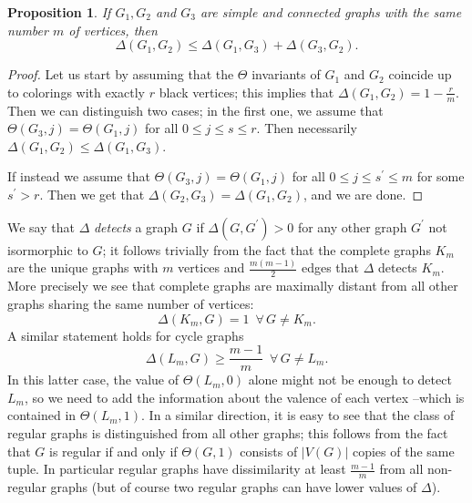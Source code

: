 \documentclass[11pt, a4paper, reqno, twoside, makeidx]{amsart}
\theoremstyle{remark}
\theoremstyle{plain}
\newtheorem{prop}[thm]{Proposition}
\theoremstyle{definition}
\begin{document}
\begin{prop}\label{prop:triangleineq}
If $G_1,G_2$ and $G_3$ are simple and connected graphs with the same number $m$ of vertices, then 
$$\Delta(G_1,G_2) \le \Delta(G_1,G_3) + \Delta(G_3,G_2).$$
\end{prop}
\begin{proof}
Let us start by assuming that the $\Theta$ invariants of $G_1$ and $G_2$ coincide up to colorings with exactly $r$ black vertices; this implies that $\Delta(G_1, G_2) = 1 - \frac{r}{m}$. Then we can distinguish two cases; in the first one, we assume that $\Theta(G_3,j) = \Theta(G_1,j)$ for all $0\le j\le s \le r$. Then necessarily $\Delta(G_1,G_2) \le \Delta(G_1,G_3)$. 

If instead we assume that $\Theta(G_3,j) = \Theta(G_1,j)$ for all $0\le j \le s^\prime \le m$ for some $s^\prime > r$. Then we get that $\Delta (G_2,G_3) = \Delta (G_1,G_2)$, and we are done.
\end{proof}

We say that $\Delta$ \emph{detects} a graph $G$ if $\Delta(G, G^\prime) >0$ for any  other graph $G^\prime$ not isormorphic to $G$; it follows trivially from the fact that the complete graphs $K_m$ are the unique graphs with $m$ vertices and $\frac{m(m-1)}{2}$ edges that $\Delta$ detects $K_m$. More precisely we see that complete graphs are maximally distant from all other graphs sharing the same number of vertices: $$\Delta(K_m,G) = 1 \, \,\,\forall \,G \neq K_m.$$ A similar statement holds for cycle graphs $$\Delta(L_m,G) \ge \frac{m -1}{m} \, \,\,\forall \,G \neq L_m.$$ In this latter case, the value of $\Theta(L_m,0)$ alone might not be enough to detect $L_m$, so we need to add the information about the valence of each vertex --which is  contained in $\Theta(L_m,1)$. 
In a similar direction, it is easy to see that the class of regular graphs is distinguished from all other graphs; this follows from the fact that $G$ is regular if and only if $\Theta(G,1)$ consists of $|V(G)|$ copies of the same tuple. In particular regular graphs have dissimilarity at least $\frac{m-1}{m}$ from all non-regular graphs (but of course two regular graphs can have lower values of $\Delta$).
~\\
\end{document}
